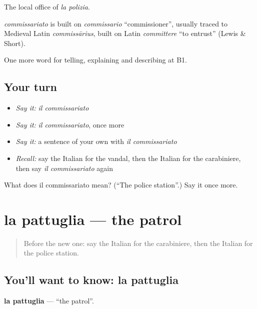 The local office of \emph{la polizia}.

\begin{cousinweb}
\emph{commissariato} is built on \emph{commissario} \textquotedblleft{}commissioner\textquotedblright{}, usually traced to Medieval Latin \emph{commissārius}, built on Latin \emph{committere} \textquotedblleft{}to entrust\textquotedblright{} (Lewis \& Short).
\end{cousinweb}

\begin{grammarlens}[title={What you've built}]
One more word for telling, explaining and describing at B1.
\end{grammarlens}

\subsection*{Your turn}
\begin{itemize}
\raggedright
  \item \emph{Say it:} \emph{il commissariato}
  \item \emph{Say it:} \emph{il commissariato}, once more
  \item \emph{Say it:} a sentence of your own with \emph{il commissariato}
  \item \emph{Recall:} say the Italian for the vandal, then the Italian for the carabiniere, then say \emph{il commissariato} again
\end{itemize}

\begin{tcolorbox}[breakable,colback=teal!4,colframe=teal!35!black,title={Before you move on}]
What does il commissariato mean? (\textquotedblleft{}The police station\textquotedblright{}.) Say it once more.
\end{tcolorbox}
\section[la pattuglia]{la pattuglia — the patrol}

\label{lesson:IT-C294-pattuglia}



\begin{quote}
Before the new one: say the Italian for the carabiniere, then the Italian for the police station.
\end{quote}

\subsection*{You'll want to know: la pattuglia}
\textbf{la pattuglia} — \textquotedblleft{}the patrol\textquotedblright{}.

